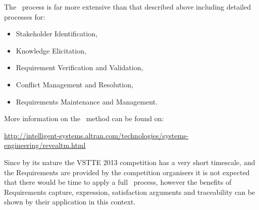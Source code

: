 The \reveal\ process is far more extensive than that described above
including detailed processes for:

\begin{itemize}
\item Stakeholder Identification,
\item Knowledge Elicitation,
\item Requirement Verification and Validation,
\item Conflict Management and Resolution,
\item Requirements Maintenance and Management.
\end{itemize}

\noindent
More information on the \reveal\ method can be found on:
\begin{center}
  \scriptsize
  \url{http://intelligent-systems.altran.com/technologies/systems-engineering/revealtm.html}
\end{center}

\noindent
Since by its nature the VSTTE 2013 competition has a very short
timescale, and the Requirements are provided by the competition
organisers it is not expected that there would be time to apply a full
\reveal\ process, however the benefits of Requirements
capture, expression, satisfaction arguments and traceability can be
shown by their application in this context.

